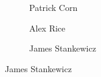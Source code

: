 \begin{frame}[plain]
\begin{figure}[h]
\begin{subfigure}{0.23\textwidth}
	\caption{Patrick Corn}
	\end{subfigure}
	\begin{subfigure}{0.23\textwidth}
	\captionsetup{labelformat=empty}
	\centering
	\caption{Alex Rice}
	\end{subfigure}
	\begin{subfigure}{0.25\textwidth}
	\captionsetup{labelformat=empty}
	\centering
	\caption{James Stankewicz}
	\end{subfigure}
	\end{figure}
\end{frame}


